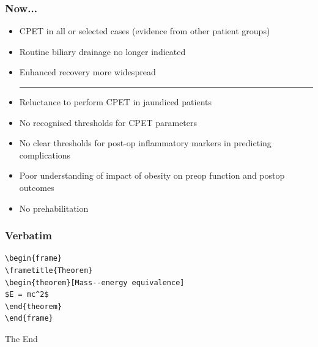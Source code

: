 \documentclass[10pt]{beamer}
\begin{document}
\begin{frame}
	\frametitle{Now... }
	\begin{itemize}
		\item CPET in all or selected cases (evidence from other patient groups)
		\item Routine biliary drainage no longer indicated
		\item Enhanced recovery more widespread
		\medskip
		\hrule
		\medskip
		\item Reluctance to perform CPET in jaundiced patients
		\item No recognised thresholds for CPET parameters
		\item No clear thresholds for post-op inflammatory markers in predicting complications
		\item Poor understanding of impact of obesity on preop function and postop outcomes
		\item No prehabilitation
	\end{itemize}
\end{frame}


\begin{frame}[fragile] %
\frametitle{Verbatim}
\begin{example}
\begin{verbatim}
\begin{frame}
\frametitle{Theorem}
\begin{theorem}[Mass--energy equivalence]
$E = mc^2$
\end{theorem}
\end{frame}\end{verbatim}
\end{example}
\end{frame}



\begin{frame}
\Huge{\centerline{The End}}
\end{frame}

\end{document}
